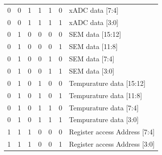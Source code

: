 \begin{table}[]
\begin{tabular}{|cccccc|l|}
    \multicolumn{1}{|c}{0} & 0                      & 1                      & 1                      & 1                      & 0 & xADC data {[}7:4{]}                    \\  
    \multicolumn{1}{|c}{0} & 0                      & 1                      & 1                      & 1                      & 1 & xADC data {[}3:0{]}                    \\  \hline
    \multicolumn{1}{|c}{0} & 1                      & 0                      & 0                      & 0                      & 0 & SEM data {[}15:12{]}                   \\  
    \multicolumn{1}{|c}{0} & 1                      & 0                      & 0                      & 0                      & 1 & SEM data {[}11:8{]}                    \\  
    \multicolumn{1}{|c}{0} & 1                      & 0                      & 0                      & 1                      & 0 & SEM data {[}7:4{]}                     \\  
    \multicolumn{1}{|c}{0} & 1                      & 0                      & 0                      & 1                      & 1 & SEM data {[}3:0{]}                     \\  \hline
    \multicolumn{1}{|c}{0} & 1                      & 0                      & 1                      & 0                      & 0 & Tempurature data {[}15:12{]}           \\  
    \multicolumn{1}{|c}{0} & 1                      & 0                      & 1                      & 0                      & 1 & Tempurature data {[}11:8{]}            \\  
    \multicolumn{1}{|c}{0} & 1                      & 0                      & 1                      & 1                      & 0 & Tempurature data {[}7:4{]}             \\  
    \multicolumn{1}{|c}{0} & 1                      & 0                      & 1                      & 1                      & 1 & Tempurature data {[}3:0{]}             \\  \hline
    \multicolumn{1}{|c}{1} & 1                      & 1                      & 0                      & 0                      & 0 & Register access Address {[}7:4{]}      \\  
    \multicolumn{1}{|c}{1} & 1                      & 1                      & 0                      & 0                      & 1 & Register access Address {[}3:0{]}      \\  \hline

\end{tabular}
\end{table}
